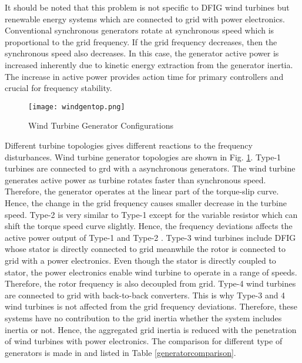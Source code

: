It should be noted that this problem is not specific to DFIG wind turbines but renewable energy systems which are connected to grid with power electronics. Conventional synchronous generators rotate at synchronous speed which is proportional to the grid frequency. If the grid frequency decreases, then the synchronous speed also decreases. In this case, the generator active power is increased inherently due to kinetic energy extraction from the generator inertia. The increase in active power provides action time for primary controllers and crucial for frequency stability. \par
\begin{figure}[h!]
	\centering
	\texttt{[image: windgentop.png]}
	\caption{Wind Turbine Generator Configurations \cite{Muljadi2012}}
	\label{windtop}
\end{figure}
Different turbine topologies gives different reactions to the frequency disturbances. Wind turbine generator topologies are shown in Fig. \ref{windtop}. Type-1 turbines are connected to grd with a asynchronous generators. The wind turbine generates active power as turbine rotates faster than synchronous speed. Therefore, the generator operates at the linear part of the torque-slip curve. Hence, the change in the grid frequency causes smaller decrease in the turbine speed. Type-2 is very similar to Type-1 except for the variable resistor which can shift the torque speed curve slightly. Hence, the frequency deviations affects the active power output of Type-1 and Type-2 \cite{Muljadi2012}. Type-3 wind turbines include DFIG whose stator is directly connected to grid meanwhile the rotor is connected to grid with a power electronics. Even though the stator is directly coupled to stator, the power electronics enable wind turbine to operate in a range of speeds. Therefore, the rotor frequency is also decoupled from grid. Type-4 wind turbines are connected to grid with back-to-back converters. This is why Type-3 and 4 wind turbines is not affected from the grid frequency deviations. Therefore, these systems have no contribution to the grid inertia whether the system includes inertia or not. Hence, the aggregated grid inertia is reduced with the penetration of wind turbines with power electronics. The comparison for different type of generators is made in \cite{VanDeVyver2016} and listed in Table \ref{generatorcomparison}.\par  
